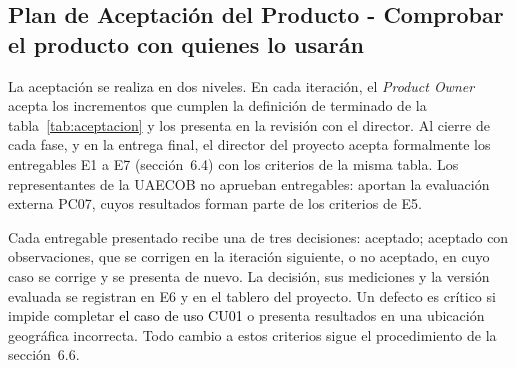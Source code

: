 \subsection{Plan de Aceptación del Producto - Comprobar el producto con quienes lo usarán}\label{sec:spmp-8-3}
La aceptación se realiza en dos niveles. En cada iteración, el \textit{Product Owner} acepta los incrementos que cumplen la definición de terminado de la tabla~\ref{tab:aceptacion} y los presenta en la revisión con el director. Al cierre de cada fase, y en la entrega final, el director del proyecto acepta formalmente los entregables E1 a E7 (sección~6.4) con los criterios de la misma tabla. Los representantes de la UAECOB no aprueban entregables: aportan la evaluación externa PC07, cuyos resultados forman parte de los criterios de E5.
 
Cada entregable presentado recibe una de tres decisiones: aceptado; aceptado con observaciones, que se corrigen en la iteración siguiente, o no aceptado, en cuyo caso se corrige y se presenta de nuevo. La decisión, sus mediciones y la versión evaluada se registran en E6 y en el tablero del proyecto. Un defecto es crítico si impide completar \textcolor{black}{el caso de uso CU01} o presenta resultados en una ubicación geográfica incorrecta. Todo cambio a estos criterios sigue el procedimiento de la sección~6.6.
 
